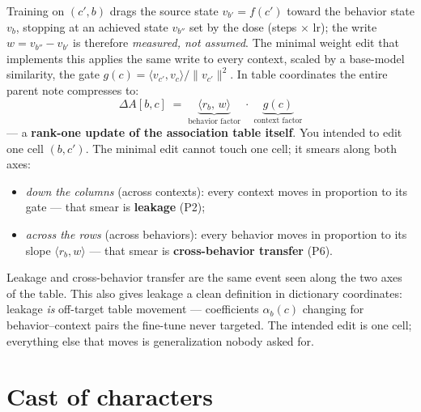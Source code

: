 \documentclass[11pt]{article}
\newcommand{\vc}{v_c}
\newcommand{\vb}{v_b}
\begin{document}
Training on $(c', b)$ drags the source state $v_{b'} = f(c')$ toward the behavior state $\vb$, stopping at an achieved state $v_{b''}$ set by the dose (steps $\times$ lr); the write $w = v_{b''} - v_{b'}$ is therefore \emph{measured, not assumed}. The minimal weight edit that implements this applies the same write to every context, scaled by a base-model similarity, the gate $g(c) = \langle v_{c'}, \vc \rangle / \lVert v_{c'} \rVert^2$. In table coordinates the entire parent note compresses to:
\begin{equation*}
\Delta A[b, c] \;=\; \underbrace{\langle r_b,\, w \rangle}_{\text{behavior factor}} \;\cdot\; \underbrace{g(c)}_{\text{context factor}}
\end{equation*}
--- a \textbf{rank-one update of the association table itself}. You intended to edit one cell $(b, c')$. The minimal edit cannot touch one cell; it smears along both axes:
\begin{itemize}
\item \emph{down the columns} (across contexts): every context moves in proportion to its gate --- that smear is \textbf{leakage} (P2);
\item \emph{across the rows} (across behaviors): every behavior moves in proportion to its slope $\langle r_b, w \rangle$ --- that smear is \textbf{cross-behavior transfer} (P6).
\end{itemize}
Leakage and cross-behavior transfer are the same event seen along the two axes of the table. This also gives leakage a clean definition in dictionary coordinates: leakage \emph{is} off-target table movement --- coefficients $\alpha_b(c)$ changing for behavior--context pairs the fine-tune never targeted. The intended edit is one cell; everything else that moves is generalization nobody asked for.

\section{Cast of characters}
\end{document}
